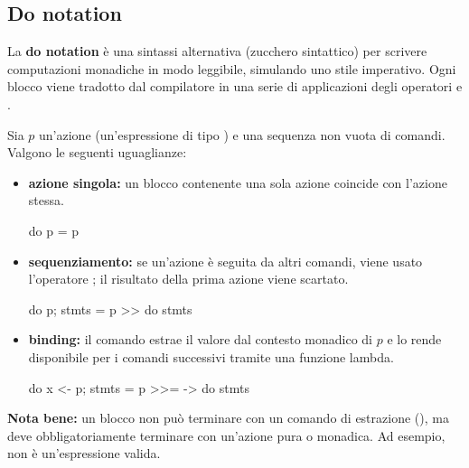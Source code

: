 \subsection{Do notation}
La \textbf{do notation} è una sintassi alternativa (zucchero sintattico) per scrivere computazioni monadiche in modo leggibile, simulando uno stile imperativo. Ogni blocco  viene tradotto dal compilatore in una serie di applicazioni degli operatori \code{>>=} e \code{>>}.

Sia $p$ un'azione (un'espressione di tipo ) e  una sequenza non vuota di comandi. Valgono le seguenti uguaglianze:
\begin{itemize}
    \item \textbf{azione singola:} un blocco  contenente una sola azione coincide con l'azione stessa.
    \begin{haskellbox}{}
do {p} = p
    \end{haskellbox}

    \item \textbf{sequenziamento:} se un'azione è seguita da altri comandi, viene usato l'operatore \code{>>}; il risultato della prima azione viene scartato.
    \begin{haskellbox}{}
do {p; stmts} = p >> do {stmts}
    \end{haskellbox}

    \item \textbf{binding:} il comando  estrae il valore dal contesto monadico di $p$ e lo rende disponibile per i comandi successivi tramite una funzione lambda.
    \begin{haskellbox}{}
do {x <- p; stmts} = p >>= \x -> do {stmts}
    \end{haskellbox}
\end{itemize}

\textbf{Nota bene:} un blocco  non può terminare con un comando di estrazione (), ma deve obbligatoriamente terminare con un'azione pura o monadica. Ad esempio,  non è un'espressione valida.

